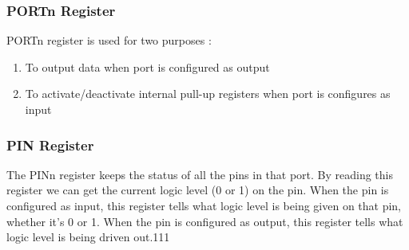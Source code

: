 
\subsubsection{PORTn Register}
PORTn register is used for two purposes : \\
\begin{enumerate}
	\item To output data when port is configured as output
    \item To activate/deactivate internal pull-up registers when port is configures as input
\end{enumerate}


\subsubsection{PIN Register}
The PINn register keeps the status of all the pins in that port. By reading this register we can get the current logic level (0 or 1) on the pin. When the pin is configured as input, this register tells what logic level is being given on that pin, whether it’s 0 or 1. When the pin is configured as output, this register tells what logic level is being driven out.111

